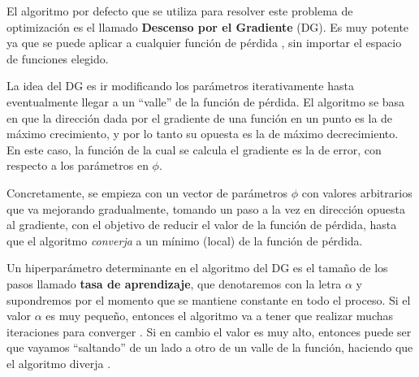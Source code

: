 \documentclass[../../main.tex]{subfiles}
\begin{document}
El algoritmo por defecto que se utiliza para resolver este problema de optimización es el
llamado \textbf{Descenso por el Gradiente} (DG). Es muy potente ya que se puede aplicar a
cualquier función de pérdida \cite{ai-a-modern-approach}, sin importar el espacio de
funciones elegido.

La idea del DG es ir modificando los parámetros iterativamente hasta eventualmente llegar
a un ``valle'' de la función de pérdida. El algoritmo se basa en que la dirección dada por
el gradiente\footnotemark{} de una función en un punto es la de máximo crecimiento, y por
lo tanto su opuesta es la de máximo decrecimiento. En este caso, la función de la cual se
calcula el gradiente es la de error, con respecto a los parámetros en \(\phi\).

Concretamente, se empieza con un vector de parámetros \(\phi\) con valores arbitrarios que
va mejorando gradualmente, tomando un paso a la vez en dirección opuesta al gradiente, con
el objetivo de reducir el valor de la función de pérdida, hasta que el algoritmo
\textit{converja} a un mínimo (local) de la función de pérdida.

Un hiperparámetro\footnotemark{} determinante en el algoritmo del DG es el tamaño de los
pasos llamado \textbf{tasa de aprendizaje}, que denotaremos con la letra \(\alpha\) y
supondremos por el momento que se mantiene constante en todo el proceso. Si el valor
\(\alpha\) es muy pequeño, entonces el algoritmo va a tener que realizar muchas
iteraciones para converger \cite{hands-on-ML-sklearn-tf}. Si en cambio el valor es muy
alto, entonces puede ser que vayamos ``saltando'' de un lado a otro de un valle de la
función, haciendo que el algoritmo diverja \cite{hands-on-ML-sklearn-tf}.
\end{document}
